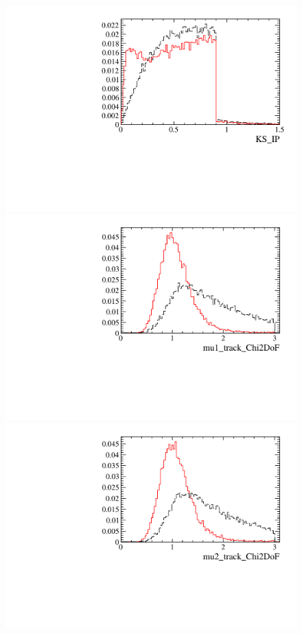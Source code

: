 \begin{figure} [htb!]
\begin{center}
\includegraphics[scale=0.20]{figs/KS_IPFULL.pdf}
\includegraphics[scale=0.20]{figs/mu1_track_Chi2DoFFULL.pdf}
\includegraphics[scale=0.20]{figs/mu2_track_Chi2DoFFULL.pdf}

\end{center}
\end{figure}
